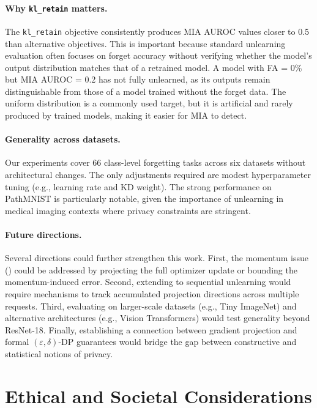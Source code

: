 \documentclass{article}
\newcommand{\klr}{\texttt{kl\_retain}}
\newcommand{\new}[1]{{\color{orange}#1}}
\begin{document}
\paragraph{Why \klr{} matters.}
The \klr{} objective consistently produces MIA AUROC values closer to 0.5 than alternative objectives.
This is important because standard unlearning evaluation often focuses on forget accuracy without verifying whether the model's output distribution matches that of a retrained model.
A model with FA = 0\% but MIA AUROC = 0.2 has not fully unlearned, as its outputs remain distinguishable from those of a model trained without the forget data.
The uniform distribution is a commonly used target, but it is artificial and rarely produced by trained models, making it easier for MIA to detect.

\paragraph{Generality across datasets.}
\new{Our experiments cover 66 class-level forgetting tasks across six datasets without architectural changes.}
The only adjustments required are modest hyperparameter tuning (e.g., learning rate and KD weight).
The strong performance on PathMNIST is particularly notable, given the importance of unlearning in medical imaging contexts where privacy constraints are stringent.

\paragraph{Future directions.}
Several directions could further strengthen this work.
First, the momentum issue () could be addressed by projecting the full optimizer update or bounding the momentum-induced error.
Second, extending to sequential unlearning would require mechanisms to track accumulated projection directions across multiple requests.
Third, evaluating on larger-scale datasets (e.g., Tiny ImageNet) and alternative architectures (e.g., Vision Transformers) would test generality beyond ResNet-18.
Finally, establishing a connection between gradient projection and formal $(\varepsilon, \delta)$-DP guarantees would bridge the gap between constructive and statistical notions of privacy.

\section{Ethical and Societal Considerations}\label{sec:ethics}
\end{document}

